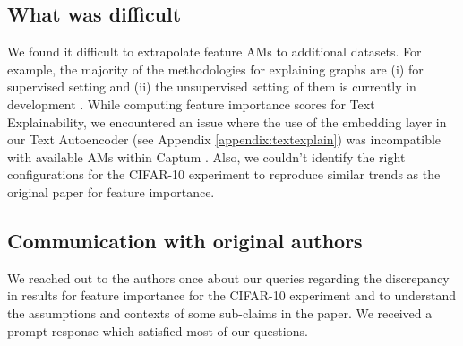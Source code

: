 
\subsection{What was difficult}




We found it difficult to extrapolate feature AMs to additional datasets. For example, the majority of the methodologies for explaining graphs are (i) for supervised setting \citep{gnnpaper} and (ii) the unsupervised setting of them is currently in development \citep{torchgeo:online}. While computing feature importance scores for Text Explainability, we encountered an issue where the use of the embedding layer in our Text Autoencoder (see Appendix \ref{appendix:textexplain}) was incompatible with available AMs within Captum \citep{Captum:online}. Also, we couldn't identify the right configurations for the CIFAR-10 experiment to reproduce similar trends as the original paper for feature importance.

\subsection{Communication with original authors}
We reached out to the authors once about our queries regarding the discrepancy in results for feature importance for the CIFAR-10 experiment and to understand the assumptions and contexts of some sub-claims in the paper. We received a prompt response which satisfied most of our questions. 
